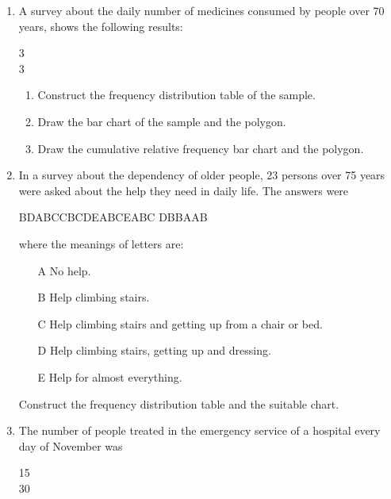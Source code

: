 \begin{enumerate}[leftmargin=*]
\item A survey about the daily number of medicines consumed by people over 70 years, shows the following results:

\begin{center}
3 \\
3
\end{center}

\begin{enumerate}
\item Construct the frequency distribution table of the sample.
\item Draw the bar chart of the sample and the polygon.
\item Draw the cumulative relative frequency bar chart and the polygon.
\end{enumerate}

\item In a survey about the dependency of older people, 23 persons over 75 years were asked about the help they need in
daily life.
The answers were
\begin{center}
B\quad D\quad A\quad B\quad C\quad C\quad B\quad C\quad D\quad E\quad A\quad B\quad C\quad E\quad A\quad B\quad C\quad
D\quad B\quad B\quad A\quad A\quad B
\end{center}

where the meanings of letters are:
\begin{enumerate}
\item[A] No help.
\item[B] Help climbing stairs.
\item[C] Help climbing stairs and getting up from a chair or bed.
\item[D] Help climbing stairs, getting up and dressing.
\item[E] Help for almost everything.
\end{enumerate}

Construct the frequency distribution table and the suitable chart.

\item\label{emergency-service} The number of people treated in the emergency service of a hospital every day of November
was
\begin{center}
15               \\
30              
\end{center}


\end{enumerate}
